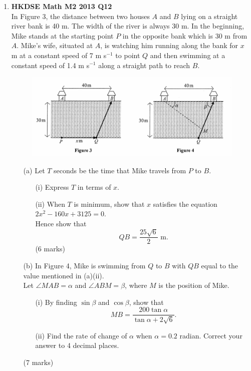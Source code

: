 \documentclass{report}
\begin{document}
\begin{enumerate}
	\item \textbf{HKDSE Math M2 2013 Q12}\\
	In Figure 3, the distance between two houses $A$ and $B$ lying on a straight river bank is 40 m. The width of the river is always 30 m. In the beginning, Mike stands at the starting point $P$ in the opposite bank which is 30 m from $A$. Mike's wife, situated at $A$, is watching him running along the bank for $x$ m at a constant speed of 7 m s$^{-1}$ to point $Q$ and then swimming at a constant speed of 1.4 m s$^{-1}$ along a straight path to reach $B$. 
	\begin{figure}[H]
		\centering
		\includegraphics[width = \linewidth]{2013Figure3n4}
	\end{figure}
	\begin{enumerate}
		\item [(a)]Let $T$ seconds be the time that Mike travels from $P$ to $B$. 
		\begin{enumerate}
			\item [(i)]Express $T$ in terms of $x$. 
			\item [(ii)]When $T$ is minimum, show that $x$ satisfies the equation $2x^2 -160x+3125 = 0$. \\
			Hence show that $$QB = \displaystyle\frac{25\sqrt{6}}{2}\text{ m.}$$ (6 marks)
		\end{enumerate}
		\item [(b)]In Figure 4, Mike is swimming from $Q$ to $B$ with $QB$ equal to the value mentioned in (a)(ii).\\
		Let $\angle MAB = \alpha$ and $\angle ABM = \beta$, where $M$ is the position of Mike.
		\begin{enumerate}
			\item [(i)]By finding $\sin{\beta}$ and $\cos{\beta}$, show that $$MB = \displaystyle\frac{200\tan{\alpha}}{\tan{\alpha} + 2\sqrt{6}}.$$ 
			\item [(ii)]Find the rate of change of $\alpha$ when $\alpha = 0.2$ radian. Correct your answer to 4 decimal places.
		\end{enumerate}
		(7 marks)
	\end{enumerate}


\end{enumerate}
\end{document}
